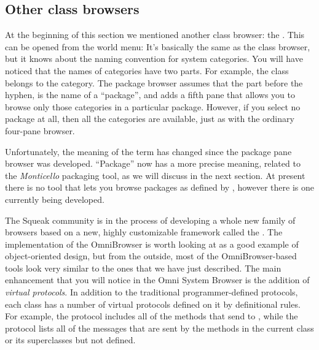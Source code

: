 \documentclass[a4paper,10pt,twoside]{book}
\begin{document}

\subsection{Other class browsers}
\label{sec:otherBrowsers}

At the beginning of this section we mentioned another class browser: the . 
This can be opened from the world menu: 
It's basically the same as the class browser, but it knows about the naming convention for system categories.
You will have noticed that the names of categories have two parts.
For example, the  class belongs to the  category.
\label{sec:package-names}
The package browser assumes that the part before the hyphen,  is the name of a ``package'', and adds a fifth pane that allows you to browse only those categories in a particular package.
However, if you select no package at all, then all the categories are available, just as with the ordinary four-pane browser.

Unfortunately, the meaning of the term  has changed since the package pane browser was developed.  ``Package'' now has a more precise meaning, related to the \emph{Monticello} packaging tool, as we will discuss in the next section.  At present there is no tool that lets you browse packages as defined by , however there is one currently being developed.

The Squeak community is in the process of developing a whole new family of browsers based on a new, highly customizable framework called the .  The implementation of the OmniBrowser is worth looking at as a good example of object-oriented design,  but from the outside, most of the OmniBrowser-based tools look very similar to the ones that we have just described.  
The main enhancement that you will notice in the Omni System Browser is the addition of \emph{virtual protocols}.
In addition to the traditional programmer-defined protocols, each class has a number of virtual protocols defined on it by definitional rules.  For example, the  protocol includes all of the methods that send to \super, while the  protocol lists all of the messages that are sent by the methods in the current class or its superclasses but not defined.
\end{document}
